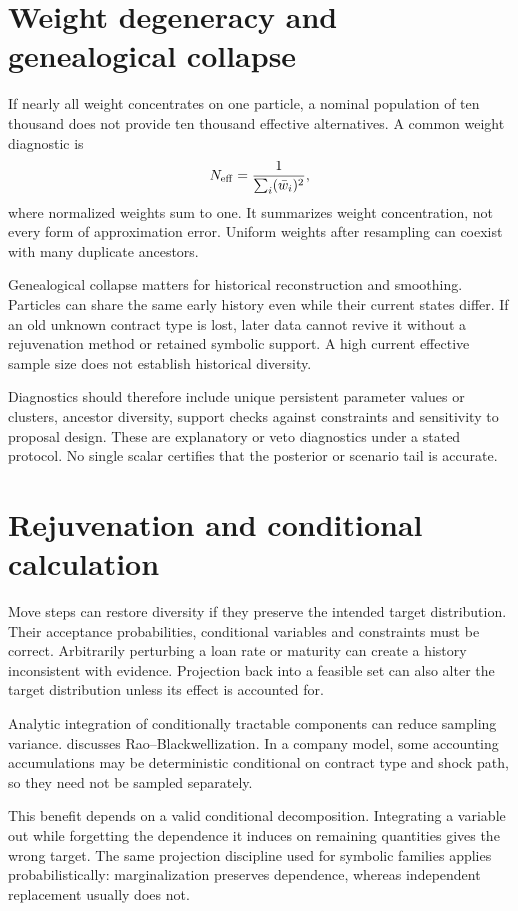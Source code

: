 \section{Weight degeneracy and genealogical collapse}
If nearly all weight concentrates on one particle, a nominal population of ten thousand does not provide ten thousand effective alternatives. A common weight diagnostic is
\begin{equation}
 N_{\rm eff}=\frac{1}{\sum_i(\bar w_i)^2},
\end{equation}
where normalized weights sum to one. It summarizes weight concentration, not every form of approximation error. Uniform weights after resampling can coexist with many duplicate ancestors.

Genealogical collapse matters for historical reconstruction and smoothing. Particles can share the same early history even while their current states differ. If an old unknown contract type is lost, later data cannot revive it without a rejuvenation method or retained symbolic support. A high current effective sample size does not establish historical diversity.

Diagnostics should therefore include unique persistent parameter values or clusters, ancestor diversity, support checks against constraints and sensitivity to proposal design. These are explanatory or veto diagnostics under a stated protocol. No single scalar certifies that the posterior or scenario tail is accurate.

\section{Rejuvenation and conditional calculation}
Move steps can restore diversity if they preserve the intended target distribution. Their acceptance probabilities, conditional variables and constraints must be correct. Arbitrarily perturbing a loan rate or maturity can create a history inconsistent with evidence. Projection back into a feasible set can also alter the target distribution unless its effect is accounted for.

Analytic integration of conditionally tractable components can reduce sampling variance. \citet[Section 4.6]{doucet2012tutorial} discusses Rao--Blackwellization. In a company model, some accounting accumulations may be deterministic conditional on contract type and shock path, so they need not be sampled separately.

This benefit depends on a valid conditional decomposition. Integrating a variable out while forgetting the dependence it induces on remaining quantities gives the wrong target. The same projection discipline used for symbolic families applies probabilistically: marginalization preserves dependence, whereas independent replacement usually does not.

